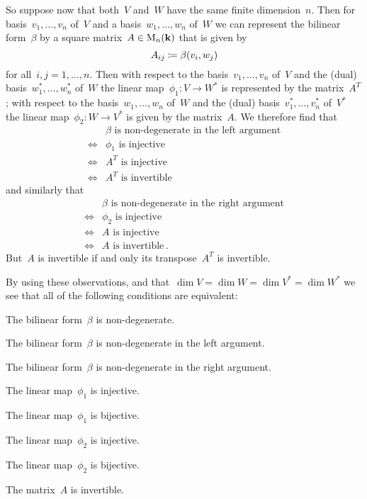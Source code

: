 \begin{recall}
  So suppose now that both~$V$ and~$W$ have the same finite dimension~$n$.
  Then for basis~$v_1, \dotsc, v_n$ of~$V$ and a basis~$w_1, \dotsc, w_n$ of~$W$ we can represent the bilinear form~$\beta$ by a square matrix~$A \in \operatorname{M}_n(\mathbf{k})$ that is given by
  \[
    A_{ij}
    \coloneqq
    \beta(v_i, w_j)
  \]
  for all~$i,j = 1, \dotsc, n$.
  Then with respect to the basis~$v_1, \dotsc, v_n$ of~$V$ and the (dual) basis~$w_1^*, \dotsc, w_n^*$ of~$W$ the linear map~$\phi_1 \colon V \to W^*$ is represented by the matrix~$A^T$;
  with respect to the basis~$w_1, \dotsc, w_n$ of~$W$ and the (dual) basis~$v_1^*, \dotsc, v_n^*$ of~$V^*$ the linear map~$\phi_2 \colon W \to V^*$ is given by the matrix~$A$.
  We therefore find that
  \begin{align*}
        {}& \text{$\beta$ is non-degenerate in the left argument} \\
    \iff{}& \text{$\phi_1$ is injective}  \\
    \iff{}& \text{$A^T$ is injective} \\
    \iff{}& \text{$A^T$ is invertible}
  \end{align*}
  and similarly that
  \begin{align*}
        {}& \text{$\beta$ is non-degenerate in the right argument} \\
    \iff{}& \text{$\phi_2$ is injective}  \\
    \iff{}& \text{$A$ is injective} \\
    \iff{}& \text{$A$ is invertible}  \,.
  \end{align*}
  But~$A$ is invertible if and only its transpose~$A^T$ is invertible.
  
  By using these observations, and that~$\dim V = \dim W = \dim V^* = \dim W^*$ we see that all of the following conditions are equivalent:
  \begin{equivalenceslist}
    \item
      The bilinear form~$\beta$ is non-degenerate.
    \item
      The bilinear form~$\beta$ is non-degenerate in the left argument.
    \item
      The bilinear form~$\beta$ is non-degenerate in the right argument.
    \item
      The linear map~$\phi_1$ is injective.
    \item
      The linear map~$\phi_1$ is bijective.
    \item
      The linear map~$\phi_2$ is injective.
    \item
      The linear map~$\phi_2$ is bijective.
    \item
      The matrix~$A$ is invertible.
  \end{equivalenceslist}
\end{recall}


